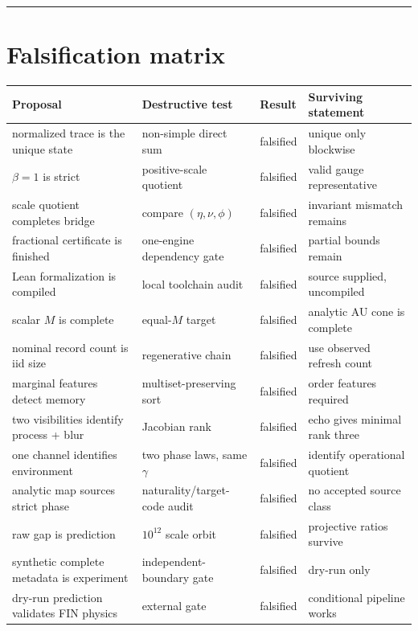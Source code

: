 \documentclass[11pt,a4paper,openany]{report}
\begin{document}
\par\medskip\hrule\medskip

\chapter{Falsification matrix}

\begin{center}
\begingroup\small
\setlength{\tabcolsep}{3.5pt}
\renewcommand{\arraystretch}{1.16}
\begin{longtable}{@{}p{}p{}p{}p{}@{}}
\toprule
\textbf{Proposal} & \textbf{Destructive test} & \textbf{Result} & \textbf{Surviving statement} \\
\midrule
\endhead
normalized trace is the unique state & non-simple direct sum & falsified & unique only blockwise \\
\(\beta=1\) is strict & positive-scale quotient & falsified & valid gauge representative \\
scale quotient completes bridge & compare \((\eta,\nu,\phi)\) & falsified & invariant mismatch remains \\
fractional certificate is finished & one-engine dependency gate & falsified & partial bounds remain \\
Lean formalization is compiled & local toolchain audit & falsified & source supplied, uncompiled \\
scalar \(M\) is complete & equal-\(M\) target & falsified & analytic AU cone is complete \\
nominal record count is iid size & regenerative chain & falsified & use observed refresh count \\
marginal features detect memory & multiset-preserving sort & falsified & order features required \\
two visibilities identify process + blur & Jacobian rank & falsified & echo gives minimal rank three \\
one channel identifies environment & two phase laws, same \(\gamma\) & falsified & identify operational quotient \\
analytic map sources strict phase & naturality/\allowbreak{}target-code audit & falsified & no accepted source class \\
raw gap is prediction & \(10^{12}\) scale orbit & falsified & projective ratios survive \\
synthetic complete metadata is experiment & independent-boundary gate & falsified & dry-run only \\
dry-run prediction validates FIN physics & external gate & falsified & conditional pipeline works \\
\bottomrule
\end{longtable}
\endgroup
\end{center}
\end{document}
